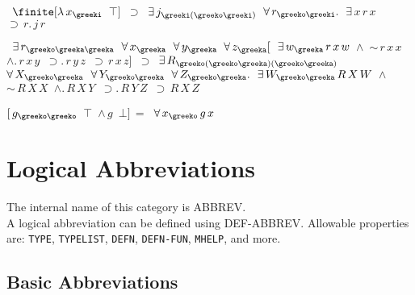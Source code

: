 \begin{description}
\item[\parbox{\textwidth}{X6106\index{X6106@X6106, {\bf Theorem}} }] \texttt{$ $ $\finite [ \lambda \,x_{\greeki} $ $\top ] $ $\supset $ $\exists \,j_{\greeki(\greeko\greeki)} $ $\forall \,r_{\greeko\greeki} . $ $\exists \,x \,r \,x $ $\supset \,r . \,j \,r$}


\item[\parbox{\textwidth}{X6201\index{X6201@X6201, {\bf Theorem}} }] \texttt{$ $ $\exists \,r_{\greeko\greeka\greeka} $ $\forall \,x_{\greeka} $ $\forall \,y_{\greeka} $ $\forall \,z_{\greeka} [ $ $\exists \,w_{\greeka} \,r \,x \,w $ $\land $ $\sim \,r \,x \,x $ $\land . \,r \,x \,y $ $\supset . \,r \,y \,z $ $\supset \,r \,x \,z ] $ $\supset $ $\exists \,R_{\greeko(\greeko\greeka)(\greeko\greeka)} $ $\forall \,X_{\greeko\greeka} $ $\forall \,Y_{\greeko\greeka} $ $\forall \,Z_{\greeko\greeka} . $ $\exists \,W_{\greeko\greeka} \,R \,X \,W $ $\land $ $\sim \,R \,X \,X $ $\land . \,R \,X \,Y $ $\supset . \,R \,Y \,Z $ $\supset \,R \,X \,Z$}


\item[\parbox{\textwidth}{X8030A\index{X8030A@X8030A, {\bf Theorem}} }] \texttt{$ [ \,g_{\greeko\greeko} $ $\top $ $\land \,g $ $\bot ] \,= $ $\forall \,x_{\greeko} \,g \,x$}
\item
\end{description}
\chapter{Logical Abbreviations}
The internal name of this category is 
ABBREV.\\
A logical abbreviation can be defined using DEF-ABBREV.
Allowable properties are: \texttt{TYPE}, \texttt{TYPELIST}, \texttt{DEFN}, \texttt{DEFN-FUN}, \texttt{MHELP}, and more.

\section{Basic Abbreviations}

